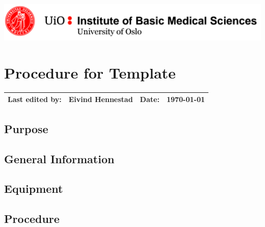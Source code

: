 \newpage

\thispagestyle{ft}

\hfill\includegraphics[width=0.8\linewidth]{imb_logo.png}

\section{Procedure for \textbf{Template}}

\vspace{3mm}
\begin{tabular*}{\linewidth}{| @{\extracolsep{\fill} } llll|}
\hline
Last edited by: & Eivind Hennestad & Date: & \today \\
\hline
\end{tabular*}

\subsection{Purpose}

\subsection{General Information}

\subsection{Equipment}

\subsection{Procedure}

